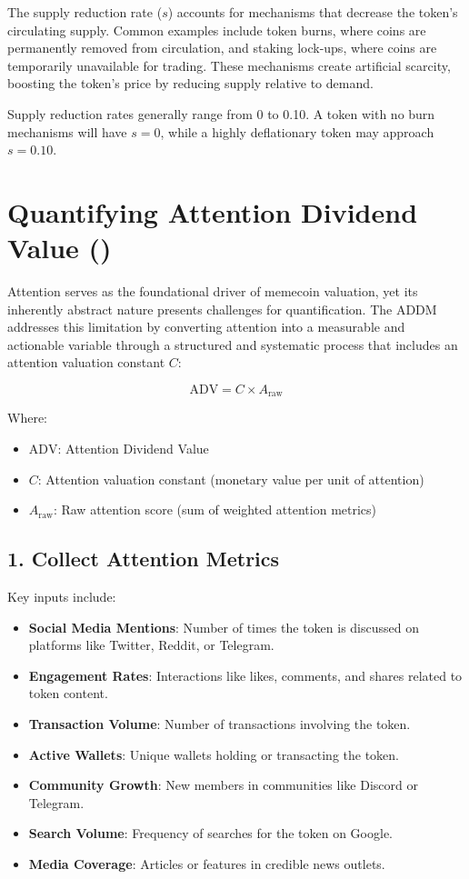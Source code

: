 \documentclass[a4paper,12pt]{article}
\begin{document}
The supply reduction rate (\( s \)) accounts for mechanisms that decrease the token's circulating supply. Common examples include token burns, where coins are permanently removed from circulation, and staking lock-ups, where coins are temporarily unavailable for trading. These mechanisms create artificial scarcity, boosting the token's price by reducing supply relative to demand.

Supply reduction rates generally range from 0 to 0.10. A token with no burn mechanisms will have \( s = 0 \), while a highly deflationary token may approach \( s = 0.10 \).

\section*{Quantifying Attention Dividend Value ()}
Attention serves as the foundational driver of memecoin valuation, yet its inherently abstract nature presents challenges for quantification. The ADDM addresses this limitation by converting attention into a measurable and actionable variable through a structured and systematic process that includes an attention valuation constant \( C \):

\[
\text{ADV} = C \times A_{\text{raw}}
\]

Where:

\begin{itemize}
    \item \( \text{ADV} \): Attention Dividend Value
    \item \( C \): Attention valuation constant (monetary value per unit of attention)
    \item \( A_{\text{raw}} \): Raw attention score (sum of weighted attention metrics)
\end{itemize}

\subsection*{1. Collect Attention Metrics}
Key inputs include:

\begin{itemize}
    \item \textbf{Social Media Mentions}: Number of times the token is discussed on platforms like Twitter, Reddit, or Telegram.
    \item \textbf{Engagement Rates}: Interactions like likes, comments, and shares related to token content.
    \item \textbf{Transaction Volume}: Number of transactions involving the token.
    \item \textbf{Active Wallets}: Unique wallets holding or transacting the token.
    \item \textbf{Community Growth}: New members in communities like Discord or Telegram.
    \item \textbf{Search Volume}: Frequency of searches for the token on Google.
    \item \textbf{Media Coverage}: Articles or features in credible news outlets.
\end{itemize}
\end{document}
